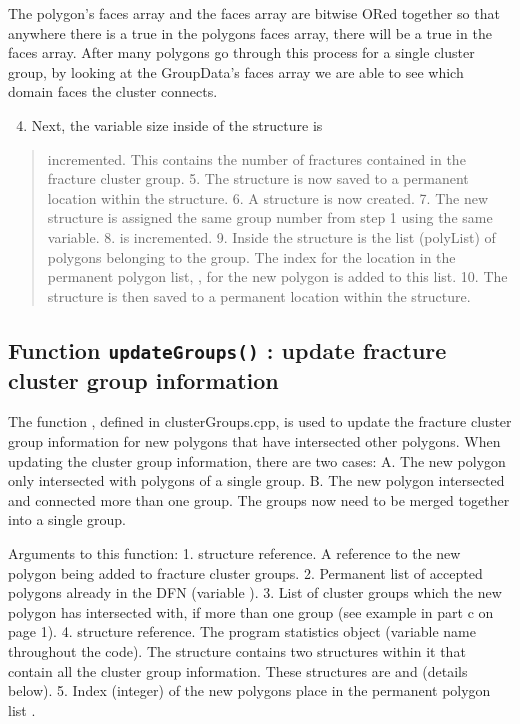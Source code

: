\documentclass[letterpaper,10pt,english]{sphinxmanual}
\begin{document}
The polygon’s faces array and the  faces array are bitwise ORed
together so that anywhere there is a true in the polygons faces array, there
will be a true in the  faces array. After many polygons go
through this process for a single cluster group, by looking at the GroupData’s
faces array we are able to see which domain faces the cluster connects.
\begin{enumerate}
\setcounter{enumi}{3}
\item {} 
Next, the variable size inside of the structure  is

\end{enumerate}
\begin{quote}

incremented. This contains the number of fractures contained in the fracture
cluster group.  5.   The  structure is now saved to a permanent
location within the  structure.  6. A  structure
is now created.  7.  The new  structure is assigned the
same group number from step 1 using the same  variable.  8.
 is incremented.  9. Inside the  structure
is the list (polyList) of polygons belonging to the group. The index for the
location in the permanent polygon list, , for the new polygon
is added to this list.  10.  The  structure is then saved to
a permanent location within the  structure.
\end{quote}


\subsection{Function  \texttt{updateGroups()} : update fracture cluster group information}
\label{dfngen:function-updategroups-update-fracture-cluster-group-information}
The function , defined in clusterGroups.cpp,  is used to
update the fracture cluster group information for new polygons that have
intersected other polygons. When updating the cluster group information, there
are two cases: A.       The new polygon only intersected with polygons of a single
group.  B.      The new polygon intersected and connected more than one group. The
groups now need to be merged together into a single group.

Arguments to this function: 1.   structure reference. A reference to the
new polygon being added to fracture cluster groups.  2. Permanent list of
accepted polygons already in the DFN (variable ).  3.   List of
cluster groups which the new polygon has intersected with, if more than one
group (see example in part c on page 1).  4.     structure reference.
The program statistics object (variable name  throughout the code).
The  structure contains two structures within it that contain all the
cluster group information. These structures are  and
 (details below).  5.      Index (integer) of the new polygons place in
the permanent polygon list .
\end{document}
